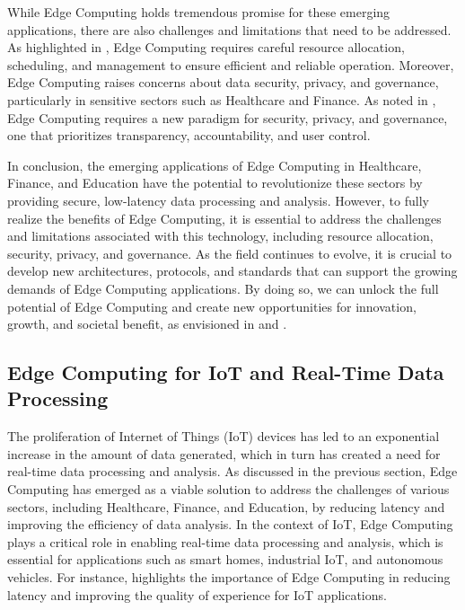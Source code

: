 \documentclass[11pt,a4paper]{article}
\begin{document}
While Edge Computing holds tremendous promise for these emerging applications, there are also challenges and limitations that need to be addressed. As highlighted in \cite{arxiv:2108.08059}, Edge Computing requires careful resource allocation, scheduling, and management to ensure efficient and reliable operation. Moreover, Edge Computing raises concerns about data security, privacy, and governance, particularly in sensitive sectors such as Healthcare and Finance. As noted in \cite{arxiv:2109.12195}, Edge Computing requires a new paradigm for security, privacy, and governance, one that prioritizes transparency, accountability, and user control.

In conclusion, the emerging applications of Edge Computing in Healthcare, Finance, and Education have the potential to revolutionize these sectors by providing secure, low-latency data processing and analysis. However, to fully realize the benefits of Edge Computing, it is essential to address the challenges and limitations associated with this technology, including resource allocation, security, privacy, and governance. As the field continues to evolve, it is crucial to develop new architectures, protocols, and standards that can support the growing demands of Edge Computing applications. By doing so, we can unlock the full potential of Edge Computing and create new opportunities for innovation, growth, and societal benefit, as envisioned in \cite{arxiv:2309.03420} and \cite{arxiv:2405.04824}.


\subsection{Edge Computing for IoT and Real-Time Data Processing}


The proliferation of Internet of Things (IoT) devices has led to an exponential increase in the amount of data generated, which in turn has created a need for real-time data processing and analysis. As discussed in the previous section, Edge Computing has emerged as a viable solution to address the challenges of various sectors, including Healthcare, Finance, and Education, by reducing latency and improving the efficiency of data analysis. In the context of IoT, Edge Computing plays a critical role in enabling real-time data processing and analysis, which is essential for applications such as smart homes, industrial IoT, and autonomous vehicles. For instance, \cite{arxiv:1703.10750} highlights the importance of Edge Computing in reducing latency and improving the quality of experience for IoT applications.
\end{document}
